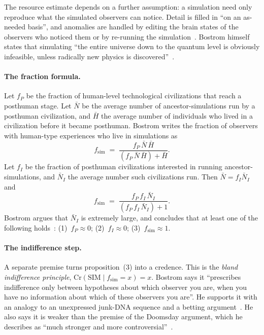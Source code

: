 The resource estimate depends on a further assumption: a simulation need only reproduce
what the simulated observers can notice. Detail is filled in ``on an as-needed basis'',
and anomalies are handled by editing the brain states of the observers who noticed them
or by re-running the simulation~\cite[\S\,III]{Bostrom2003are}. Bostrom himself states that
simulating ``the entire universe down to the quantum level is obviously infeasible,
unless radically new physics is discovered''~\cite[\S\,III]{Bostrom2003are}.

\paragraph{The fraction formula.}
Let $f_P$ be the fraction of human-level technological civilizations that reach a
posthuman stage. Let $\bar N$ be the average number of ancestor-simulations run by a
posthuman civilization, and $\bar H$ the average number of individuals who lived in a
civilization before it became posthuman. Bostrom writes the fraction of observers with
human-type experiences who live in simulations as~\cite[\S\,IV]{Bostrom2003are}
\begin{equation}
  f_{\mathrm{sim}} \;=\; \frac{f_P\,\bar N\,\bar H}{(f_P\,\bar N\,\bar H) + \bar H}.
  \label{eq:philosophy:fsim}
\end{equation}
Let $f_I$ be the fraction of posthuman civilizations interested in running
ancestor-simulations, and $\bar N_I$ the average number such civilizations run. Then
$\bar N = f_I \bar N_I$ and
\begin{equation}
  f_{\mathrm{sim}} \;=\; \frac{f_P\, f_I\, \bar N_I}{(f_P\, f_I\, \bar N_I) + 1}.
  \label{eq:philosophy:fsimstar}
\end{equation}
Bostrom argues that $\bar N_I$ is extremely large, and concludes that at least one of
the following holds~\cite[\S\,IV]{Bostrom2003are}:
(1)~$f_P \approx 0$; (2)~$f_I \approx 0$; (3)~$f_{\mathrm{sim}} \approx 1$.

\paragraph{The indifference step.}
A separate premise turns proposition~(3) into a credence. This is the \emph{bland
indifference principle},
$\mathrm{Cr}(\mathrm{SIM} \mid f_{\mathrm{sim}} = x) = x$. Bostrom says it ``prescribes
indifference only between hypotheses about which observer you are, when you have no
information about which of these observers you are''. He supports it with an analogy to
an unexpressed junk-DNA sequence and a betting argument~\cite[\S\,V]{Bostrom2003are}. He
also says it is weaker than the premise of the Doomsday argument, which he describes as
``much stronger and more controversial''~\cite[\S\,V]{Bostrom2003are}.

